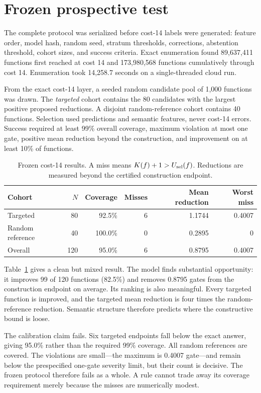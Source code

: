 \documentclass[11pt]{article}
\begin{document}
\section{Frozen prospective test}

The complete protocol was serialized before cost-14 labels were generated:
feature order, model hash, random seed, stratum thresholds, corrections,
abstention threshold, cohort sizes, and success criteria.  Exact enumeration
found 89,637,411 functions first reached at cost 14 and 173,980,568 functions
cumulatively through cost 14.  Enumeration took 14,258.7 seconds on a
single-threaded cloud run.

From the exact cost-14 layer, a seeded random candidate pool of 1,000
functions was drawn.  The \emph{targeted} cohort contains the 80 candidates
with the largest positive proposed reductions.  A disjoint random-reference
cohort contains 40 functions.  Selection used predictions and semantic
features, never cost-14 errors.  Success required at least 99\% overall
coverage, maximum violation at most one gate, positive mean reduction beyond
the construction, and improvement on at least 10\% of functions.

\begin{table}[H]
\centering\small
\caption{Frozen cost-14 results.  A miss means
$K(f)+1>U_{\rm sel}(f)$.  Reductions are measured beyond the certified
construction endpoint.}
\begin{tabular}{lrrrrr}
\toprule
Cohort & $N$ & Coverage & Misses & Mean reduction & Worst miss\\
\midrule
Targeted & 80 & 92.5\% & 6 & 1.1744 & 0.4007\\
Random reference & 40 & 100.0\% & 0 & 0.2895 & 0\\
\midrule
Overall & 120 & 95.0\% & 6 & 0.8795 & 0.4007\\
\bottomrule
\end{tabular}
\label{tab:results}
\end{table}

Table~\ref{tab:results} gives a clean but mixed result.  The model finds
substantial opportunity: it improves 99 of 120 functions (82.5\%) and removes
0.8795 gates from the construction endpoint on average.  Its ranking is also
meaningful.  Every targeted function is improved, and the targeted mean
reduction is four times the random-reference reduction.  Semantic structure
therefore predicts where the constructive bound is loose.

The calibration claim fails.  Six targeted endpoints fall below the exact
answer, giving 95.0\% rather than the required 99\% coverage.  All random
references are covered.  The violations are small---the maximum is 0.4007
gate---and remain below the prespecified one-gate severity limit, but their
count is decisive.  The frozen protocol therefore fails as a whole.  A rule
cannot trade away its coverage requirement merely because the misses are
numerically modest.
\end{document}
